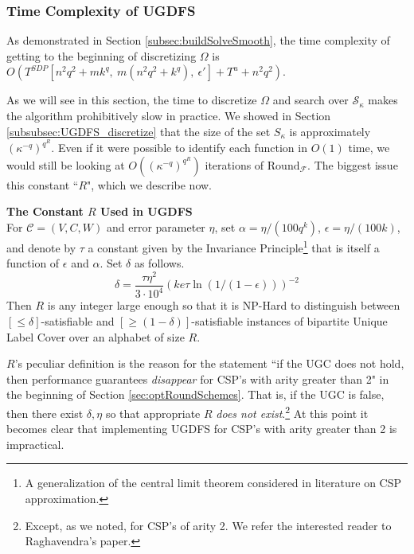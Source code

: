 \documentclass[letterpaper, 12pt]{article}
\numberwithin{equation}{section}
\begin{document}
\subsubsection{Time Complexity of UGDFS}
As demonstrated in Section \ref{subsec:buildSolveSmooth}, the time complexity of getting to the beginning of discretizing $\Omega$ is $O( T^{SDP}\left[n^2q^2 + mk^q,~ m (n^2q^2 + k^q),~\epsilon'\right] + T^u + n^2q^2)$.

As we will see in this section, the time to discretize $\Omega$ and search over $\mathcal{S}_{\kappa}$ makes the algorithm prohibitively slow in practice. We showed in Section \ref{subsubsec:UGDFS_discretize} that the size of the set $S_{\kappa}$ is approximately $\left(\kappa^{-q}\right)^{q^R}$. Even if it were possible to identify each function in $O(1)$ time, we would still be looking at $O(\left(\kappa^{-q}\right)^{q^R})$ iterations of $\text{Round}_{\mathcal{F}}$. The biggest issue this constant ``$R$", which we describe now.

\begin{definition}\textbf{The Constant $R$ Used in UGDFS}\\
For $\mathcal{C} = (V,C,W)$ and error parameter $\eta$, set $\alpha = \eta/(100q^k)$, $\epsilon = \eta/(100k)$, and denote by $\tau$ a constant given by the Invariance Principle\footnote{A generalization of the central limit theorem considered in literature on CSP approximation.} that is itself a function of $\epsilon$ and $\alpha$. Set $\delta$ as follows.
\begin{equation}
\delta = \frac{\tau \eta^2}{3\cdot 10^4} \left(k e \tau \ln(1/(1-\epsilon)) \right)^{-2}
\end{equation}
Then $R$ is any integer large enough so that it is NP-Hard to distinguish between $ 
[\leq \delta]$-satisfiable and $[\geq (1-\delta)]$-satisfiable instances of bipartite Unique Label Cover over an alphabet of size $R$.
\end{definition}

$R$'s peculiar definition is the reason for the statement ``if the UGC does not hold, then performance guarantees \textit{disappear} for CSP's with arity greater than 2" in the beginning of Section \ref{sec:optRoundSchemes}. That is, if the UGC is false, then there exist $\delta,\eta$ so that appropriate $R$ \textit{does not exist}.\footnote{Except, as we noted, for CSP's of arity 2. We refer the interested reader to Raghavendra's paper.} At this point it becomes clear that implementing UGDFS for CSP's with arity greater than 2 is impractical.
\end{document}
